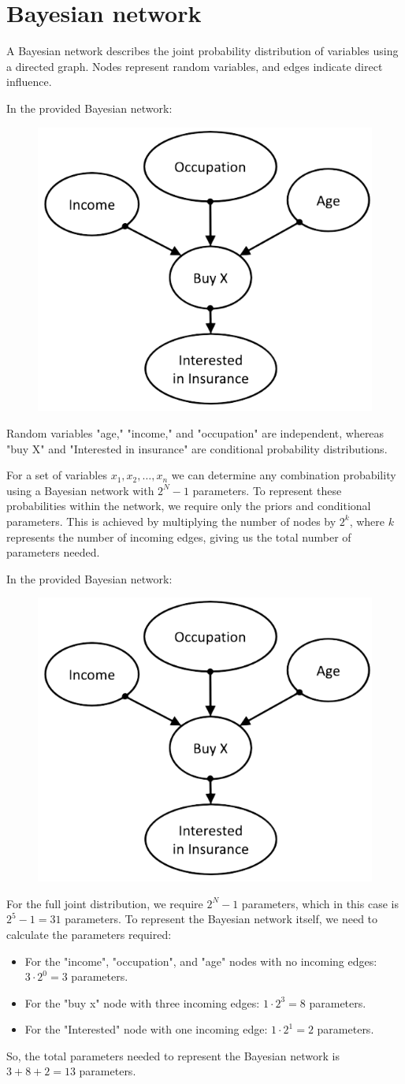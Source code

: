 \documentclass[12pt, a4paper]{report}
\begin{document}
    \section{Bayesian network}
    A Bayesian network describes the joint probability distribution of variables using a directed graph. 
    Nodes represent random variables, and edges indicate direct influence.
    \begin{example}
        In the provided Bayesian network:
        \begin{figure}[H]
            \centering
            \includegraphics[width=0.25\linewidth]{images/insurance.png}
        \end{figure}
        Random variables "age," "income," and "occupation" are independent, whereas "buy X" and "Interested in insurance" are conditional probability distributions.
    \end{example}
    For a set of variables $x_1, x_2, \ldots, x_n$ we can determine any combination probability using a Bayesian network with $2^N - 1$ parameters. 
    To represent these probabilities within the network, we require only the priors and conditional parameters. 
    This is achieved by multiplying the number of nodes by $2^k$, where $k$ represents the number of incoming edges, giving us the total number of parameters needed.
    \begin{example}
        In the provided Bayesian network:
        \begin{figure}[H]
            \centering
            \includegraphics[width=0.25\linewidth]{images/insurance.png}
        \end{figure}
        For the full joint distribution, we require $2^N - 1$ parameters, which in this case is $2^5 - 1 = 31$ parameters.
        To represent the Bayesian network itself, we need to calculate the parameters required:
        \begin{itemize}
            \item For the "income", "occupation", and "age" nodes with no incoming edges: $3 \cdot 2^0 = 3$ parameters.
            \item For the "buy x" node with three incoming edges: $1 \cdot 2^3 = 8$ parameters.
            \item For the "Interested" node with one incoming edge: $1 \cdot 2^1 = 2$ parameters.
        \end{itemize}
        So, the total parameters needed to represent the Bayesian network is $3 + 8 + 2 = 13$ parameters.
    \end{example}
\end{document}
